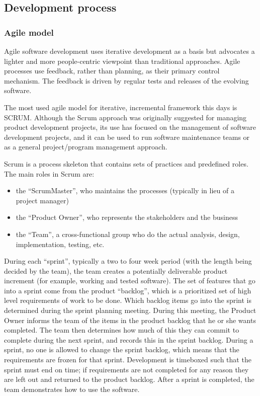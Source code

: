 \subsection{Development process}

	\subsubsection{Agile model}
	
	Agile software development uses iterative development as a basis but advocates a lighter and more people-centric viewpoint than traditional approaches. Agile processes use feedback, rather than planning, as their primary control mechanism. The feedback is driven by regular tests and releases of the evolving software. \cite{wiki:development-process}
	
	The most used agile model for iterative, incremental framework this days is SCRUM. Although the Scrum approach was originally suggested for managing product development projects, its use has focused on the management of software development projects, and it can be used to run software maintenance teams or as a general project/program management approach.\newline
	
	Scrum is a process skeleton that contains sets of practices and predefined roles. The main roles in Scrum are:
	
	\begin{itemize}
		\item the “ScrumMaster”, who maintains the processes (typically in lieu of a project manager)
		\item the “Product Owner”, who represents the stakeholders and the business
		\item the “Team”, a cross-functional group who do the actual analysis, design, implementation, testing, etc.
	\end{itemize}
	
	During each “sprint”, typically a two to four week period (with the length being decided by the team), the team creates a potentially deliverable product increment (for example, working and tested software). The set of features that go into a sprint come from the product “backlog”, which is a prioritized set of high level requirements of work to be done. Which backlog items go into the sprint is determined during the sprint planning meeting. During this meeting, the Product Owner informs the team of the items in the product backlog that he or she wants completed. The team then determines how much of this they can commit to complete during the next sprint, and records this in the sprint backlog. During a sprint, no one is allowed to change the sprint backlog, which means that the requirements are frozen for that sprint. Development is timeboxed such that the sprint must end on time; if requirements are not completed for any reason they are left out and returned to the product backlog. After a sprint is completed, the team demonstrates how to use the software.\newline
	

